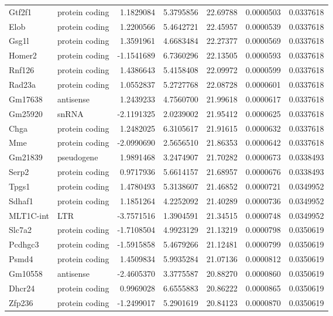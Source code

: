 \documentclass[onehalf,12pt]{beavtex}
\begin{document}
\begin{longtable}{llrrrrr}
  Gtf2f1 & protein coding & 1.1829084 & 5.3795856 & 22.69788 & 0.0000503 & 0.0337618\\
  Elob & protein coding & 1.2200566 & 5.4642721 & 22.45957 & 0.0000539 & 0.0337618\\
  Gsg1l & protein coding & 1.3591961 & 4.6683484 & 22.27377 & 0.0000569 & 0.0337618\\
  Homer2 & protein coding & -1.1541689 & 6.7360296 & 22.13505 & 0.0000593 & 0.0337618\\
  Rnf126 & protein coding & 1.4386643 & 5.4158408 & 22.09972 & 0.0000599 & 0.0337618\\
  \addlinespace
  Rad23a & protein coding & 1.0552837 & 5.2727768 & 22.08728 & 0.0000601 & 0.0337618\\
  Gm17638 & antisense & 1.2439233 & 4.7560700 & 21.99618 & 0.0000617 & 0.0337618\\
  Gm25920 & snRNA & -2.1191325 & 2.0239002 & 21.95412 & 0.0000625 & 0.0337618\\
  Chga & protein coding & 1.2482025 & 6.3105617 & 21.91615 & 0.0000632 & 0.0337618\\
  Mme & protein coding & -2.0990690 & 2.5656510 & 21.86353 & 0.0000642 & 0.0337618\\
  \addlinespace
  Gm21839 & pseudogene & 1.9891468 & 3.2474907 & 21.70282 & 0.0000673 & 0.0338493\\
  Serp2 & protein coding & 0.9717936 & 5.6614157 & 21.68957 & 0.0000676 & 0.0338493\\
  Tpgs1 & protein coding & 1.4780493 & 5.3138607 & 21.46852 & 0.0000721 & 0.0349952\\
  Sdhaf1 & protein coding & 1.1851264 & 4.2252092 & 21.40289 & 0.0000736 & 0.0349952\\
  MLT1C-int & LTR & -3.7571516 & 1.3904591 & 21.34515 & 0.0000748 & 0.0349952\\
  \addlinespace
  Slc7a2 & protein coding & -1.7108504 & 4.9923129 & 21.13219 & 0.0000798 & 0.0350619\\
  Pcdhgc3 & protein coding & -1.5915858 & 5.4679266 & 21.12481 & 0.0000799 & 0.0350619\\
  Psmd4 & protein coding & 1.4509834 & 5.9935284 & 21.07136 & 0.0000812 & 0.0350619\\
  Gm10558 & antisense & -2.4605370 & 3.3775587 & 20.88270 & 0.0000860 & 0.0350619\\
  Dhcr24 & protein coding & 0.9969028 & 6.6555883 & 20.86222 & 0.0000865 & 0.0350619\\
  \addlinespace
  Zfp236 & protein coding & -1.2499017 & 5.2901619 & 20.84123 & 0.0000870 & 0.0350619\\

\end{longtable}
\end{document}
